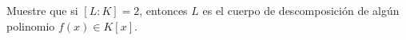 Muestre que si $[L:K]=2$, entonces $L$ es el cuerpo de descomposición de algún polinomio $f(x)\in K[x]$.
